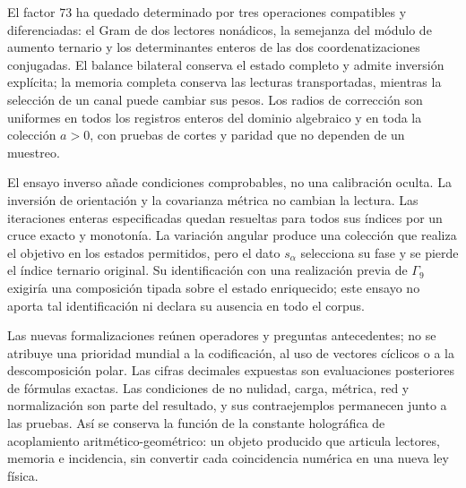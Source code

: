 El factor \(73\) ha quedado determinado por tres operaciones
compatibles y diferenciadas: el Gram de dos lectores nonádicos, la
semejanza del módulo de aumento ternario y los determinantes enteros de
las dos coordenatizaciones conjugadas. El balance bilateral conserva el estado
completo y admite inversión explícita; la memoria completa conserva las
lecturas transportadas, mientras la selección de un canal puede cambiar
sus pesos. Los radios de corrección son uniformes en todos los registros
enteros del dominio algebraico y en toda la colección \(a>0\), con
pruebas de cortes y paridad que no dependen de un muestreo.

El ensayo inverso añade condiciones comprobables, no una calibración
oculta. La inversión de orientación y la covarianza métrica no cambian
la lectura. Las iteraciones enteras especificadas quedan resueltas para
todos sus índices por un cruce exacto y monotonía. La variación angular
produce una colección que realiza el objetivo en los estados permitidos,
pero el dato \(s_\alpha\) selecciona su fase y se pierde el índice
ternario original. Su identificación con una realización previa de
\(\Gamma_9\) exigiría una composición tipada sobre el estado
enriquecido; este ensayo no aporta tal identificación ni declara su
ausencia en todo el corpus.

Las nuevas formalizaciones reúnen operadores y preguntas antecedentes;
no se atribuye una prioridad mundial a la codificación, al uso de
vectores cíclicos o a la descomposición polar. Las cifras decimales
expuestas son evaluaciones posteriores de fórmulas exactas. Las
condiciones de no nulidad, carga, métrica, red y normalización son parte
del resultado, y sus contraejemplos permanecen junto a las pruebas.
Así se conserva la función de la constante holográfica de acoplamiento
aritmético-geométrico: un objeto producido que articula lectores, memoria
e incidencia, sin convertir cada coincidencia numérica en una nueva ley
física.
